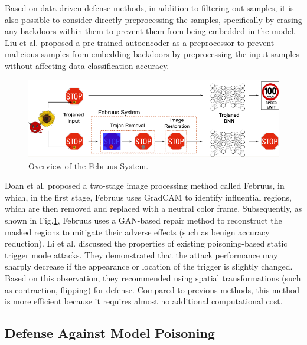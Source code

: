 \documentclass[conference]{IEEEtran}
\begin{document}
Based on data-driven defense methods, in addition to filtering out samples,
it is also possible to consider directly preprocessing the samples,
specifically by erasing any backdoors within them to prevent them from being embedded in the model.
Liu et al.\cite{b75} proposed a pre-trained autoencoder as a preprocessor to prevent malicious samples from embedding backdoors
by preprocessing the input samples without affecting data classification accuracy.

\begin{figure}[htbp]
    \centerline{\includegraphics[width=0.8\linewidth,height=0.6\linewidth]{picture/f9.png}}
    \caption{Overview of the Februus System.}
    \label{fig10}
\end{figure}
Doan et al. \cite{b76}proposed a two-stage image processing method called Februus, in which,
in the first stage, Februus uses GradCAM to identify influential regions, which are then
removed and replaced with a neutral color frame. Subsequently, as shown in Fig.\ref{fig10}, Februus uses a GAN-based
repair method to reconstruct the masked regions to mitigate their adverse effects (such as benign accuracy reduction).
Li et al. \cite{b77} discussed the properties of existing poisoning-based static trigger mode attacks. They demonstrated
that the attack performance may sharply decrease if the appearance or location of the trigger is slightly changed.
Based on this observation, they recommended using spatial transformations (such as contraction, flipping)
for defense. Compared to previous methods, this method is more efficient because it requires almost no additional computational cost.

\subsection{Defense Against Model Poisoning}
\end{document}
